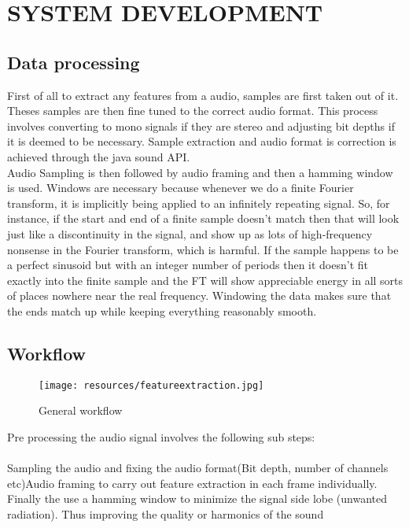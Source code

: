 \newpage
\section{SYSTEM DEVELOPMENT}
\subsection{Data processing}
First of all to extract any features from a audio, samples are first taken out of it. Theses samples are then fine tuned to the correct audio format. This process involves converting to mono signals if they are stereo and adjusting bit depths if it is deemed to be necessary. Sample extraction and audio format is correction is achieved through the java sound API.\\
Audio Sampling is then followed by audio framing and then a hamming window is used. Windows are necessary because whenever we do a finite Fourier transform, it is implicitly being applied to an infinitely repeating signal. So, for instance, if the start and end of a finite sample doesn’t match then that will look just like a discontinuity in the signal, and show up as lots of high-frequency nonsense in the Fourier transform, which is harmful. If the sample happens to be a perfect sinusoid but with an integer number of periods then it doesn't fit exactly into the finite sample and the FT will show appreciable energy in all sorts of places nowhere near the real frequency. Windowing the data makes sure that the ends match up while keeping everything reasonably smooth.
\subsection{Workflow}
        \begin{figure}[h]
            \centering
            \texttt{[image: resources/featureextraction.jpg]}
            \caption{General workflow}
            \label{fig:figure8}
        \end{figure}
\newpage
    Pre processing the audio signal involves the following sub steps:\\
    \paragraph{}
    Sampling the audio and fixing the audio format(Bit depth, number of channels etc)Audio framing to carry out feature extraction in each frame individually. Finally the use a hamming window to minimize the signal side lobe (unwanted radiation). Thus improving the quality or harmonics of the sound

